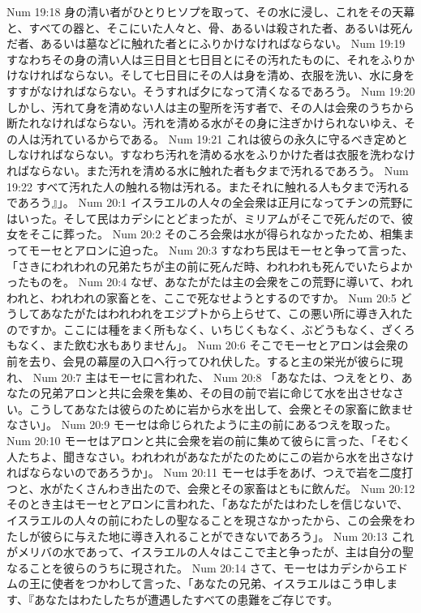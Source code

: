 Num 19:18  身の清い者がひとりヒソプを取って、その水に浸し、これをその天幕と、すべての器と、そこにいた人々と、骨、あるいは殺された者、あるいは死んだ者、あるいは墓などに触れた者とにふりかけなければならない。
Num 19:19  すなわちその身の清い人は三日目と七日目とにその汚れたものに、それをふりかけなければならない。そして七日目にその人は身を清め、衣服を洗い、水に身をすすがなければならない。そうすれば夕になって清くなるであろう。
Num 19:20  しかし、汚れて身を清めない人は主の聖所を汚す者で、その人は会衆のうちから断たれなければならない。汚れを清める水がその身に注ぎかけられないゆえ、その人は汚れているからである。
Num 19:21  これは彼らの永久に守るべき定めとしなければならない。すなわち汚れを清める水をふりかけた者は衣服を洗わなければならない。また汚れを清める水に触れた者も夕まで汚れるであろう。
Num 19:22  すべて汚れた人の触れる物は汚れる。またそれに触れる人も夕まで汚れるであろう』」。
Num 20:1  イスラエルの人々の全会衆は正月になってチンの荒野にはいった。そして民はカデシにとどまったが、ミリアムがそこで死んだので、彼女をそこに葬った。
Num 20:2  そのころ会衆は水が得られなかったため、相集まってモーセとアロンに迫った。
Num 20:3  すなわち民はモーセと争って言った、「さきにわれわれの兄弟たちが主の前に死んだ時、われわれも死んでいたらよかったものを。
Num 20:4  なぜ、あなたがたは主の会衆をこの荒野に導いて、われわれと、われわれの家畜とを、ここで死なせようとするのですか。
Num 20:5  どうしてあなたがたはわれわれをエジプトから上らせて、この悪い所に導き入れたのですか。ここには種をまく所もなく、いちじくもなく、ぶどうもなく、ざくろもなく、また飲む水もありません」。
Num 20:6  そこでモーセとアロンは会衆の前を去り、会見の幕屋の入口へ行ってひれ伏した。すると主の栄光が彼らに現れ、
Num 20:7  主はモーセに言われた、
Num 20:8  「あなたは、つえをとり、あなたの兄弟アロンと共に会衆を集め、その目の前で岩に命じて水を出させなさい。こうしてあなたは彼らのために岩から水を出して、会衆とその家畜に飲ませなさい」。
Num 20:9  モーセは命じられたように主の前にあるつえを取った。
Num 20:10  モーセはアロンと共に会衆を岩の前に集めて彼らに言った、「そむく人たちよ、聞きなさい。われわれがあなたがたのためにこの岩から水を出さなければならないのであろうか」。
Num 20:11  モーセは手をあげ、つえで岩を二度打つと、水がたくさんわき出たので、会衆とその家畜はともに飲んだ。
Num 20:12  そのとき主はモーセとアロンに言われた、「あなたがたはわたしを信じないで、イスラエルの人々の前にわたしの聖なることを現さなかったから、この会衆をわたしが彼らに与えた地に導き入れることができないであろう」。
Num 20:13  これがメリバの水であって、イスラエルの人々はここで主と争ったが、主は自分の聖なることを彼らのうちに現された。
Num 20:14  さて、モーセはカデシからエドムの王に使者をつかわして言った、「あなたの兄弟、イスラエルはこう申します、『あなたはわたしたちが遭遇したすべての患難をご存じです。
